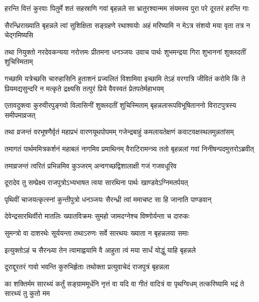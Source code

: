 


\twolineshloka
{हरन्ति वित्तं कुरवाः पितुर्मे शतं सहस्राणि गवां बृहन्नले}
{सा भ्रातुरश्वान्मम संयमस्व पुरा परे दूरतरं हरन्ति गाः}


\twolineshloka
{सैरन्ध्रिराख्याति बृहन्नले त्वां सुशिक्षिता सङ्ग्रहणे रथाश्वयोः}
{अहं मरिष्यामि न मेऽत्र संशयो मया वृता तत्र न चेद्गमिष्यसि}



\twolineshloka
{तथा नियुक्तो नरदेवकन्यया नरोत्तमः प्रीतमना धनञ्जयः}
{उवाच पार्थः शुभमन्द्रया गिरा शुभाननां शुक्लदतीं शुचिस्मिताम्}


\threelineshloka
{गच्छामि यत्रेच्छसि चारुहासिनि हुताशनं प्रज्वलितं विशामिवा}
{इच्छामि तेऽहं वरगात्रि जीवितं करोमि किं ते प्रियमद्यसुन्दरि}
{न मत्कृते द्रक्ष्यसि तत्पुरं प्रिये वैवस्वतं प्रेतपतेर्महाभयम्}



\twolineshloka
{एतावदुक्त्वा कुरुवीरपुङ्गवो विलासिनीं शुक्लदतीं शुचिस्मिताम्}
{बृहन्नलारूपविभूषिताननो विराटपुत्रस्य समीपमाव्रजत्}


\twolineshloka
{तथा व्रजन्तं वरभूषणैर्वृतं महाप्रभं वारणयूथपोपमम्}
{गजेन्द्रबाहुं कमलायतेक्षणं कवाटवक्षस्थलमुन्नतांसम्}


\twolineshloka
{तमागतं पार्थममित्रकर्शनं महाबलं नागमिव प्रमाथिनम्}
{वैराटिरामन्त्र्य ततो बृहन्नलां गवां निनीषन्पदमुत्तरोऽब्रवीत्}


\twolineshloka
{तमाव्रजन्तं त्वरितं प्रभिन्नमिव कुञ्जरम्}
{अन्वगच्छद्विशालाक्षी गजं गजवधूरिव}


\twolineshloka
{दूरादेव तु सम्प्रेक्ष्य राजपुत्रोऽभ्यभाषत}
{त्वया सारथिना पार्थः खाण्डवेऽग्निमतर्पयत्}


\twolineshloka
{पृथिवीं चाजयत्कृत्स्नां कुन्तीपुत्रो धनञ्जयः}
{सैरन्ध्री त्वां ममाचष्ट सा हि जानाति पाण्डवान्}


\twolineshloka
{देवेन्द्रसारथिर्वीरो मातलिः ख्यातविक्रमः}
{सुमहो जामदग्नेश्च विष्णोर्यन्ता च दारुकः}


\twolineshloka
{सुमन्त्रो वा दाशरथेः सूर्ययन्ता तथाऽरुणः}
{सर्वे सारथयः ख्याता न बृहन्नलया समाः}


\twolineshloka
{इत्युक्तोऽहं च सैरन्ध्र्या तेन त्वामाह्वयामि वै}
{आहुता त्वं मया सार्धं योद्धुं याहि बृहन्नले}


\twolineshloka
{दूराद्दूरतरं गावो भवन्ति कुरुभिर्हृताः}
{तथोक्ता प्रत्युवाचेदं राजपुत्रं बृहन्नला}


\threelineshloka
{का शक्तिर्मम सारथ्यं कर्तुं सङ्ग्राममूर्धनि}
{नृत्तं वा यदि वा गीतं वादित्रं वा पृथग्विधम्}
{तत्करिष्यामि भद्रं ते सारथ्यं तु कुतो मम}

